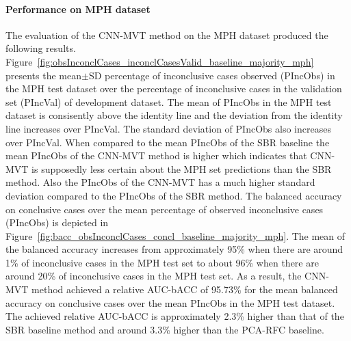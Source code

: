 
\paragraph{Performance on MPH dataset}

The evaluation of the CNN-MVT method on the MPH dataset produced the following results.
Figure~\ref{fig:obsInconclCases_inconclCasesValid_baseline_majority_mph} presents
the mean$\pm$SD percentage of inconclusive cases observed (PIncObs) in the MPH test dataset 
over the percentage of inconclusive cases in the validation set (PIncVal) of development dataset.
The mean of PIncObs in the MPH test dataset is consisently above the identity line 
and the deviation from the identity line increases over PIncVal.
The standard deviation of PIncObs also increases over PIncVal.
When compared to the mean PIncObs of the SBR baseline the mean PIncObs of the CNN-MVT method is higher 
which indicates that CNN-MVT is supposedly less certain about the MPH set predictions than the SBR method.
Also the PIncObs of the CNN-MVT has a much higher standard deviation compared to the PIncObs of the SBR method.
The balanced accuracy on conclusive cases over the mean percentage of observed inconclusive cases (PIncObs) is depicted 
in Figure~\ref{fig:bacc_obsInconclCases_concl_baseline_majority_mph}.
The mean of the balanced accuracy increases from approximately 95\% 
when there are around 1\% of inconclusive cases in the MPH test set to about 96\% 
when there are around 20\% of inconclusive cases in the MPH test set.
As a result, the CNN-MVT method achieved a relative AUC-bACC of 95.73\% for the mean balanced accuracy on conclusive cases 
over the mean PIncObs in the MPH test dataset.
The achieved relative AUC-bACC is approximately 2.3\% higher than that of the SBR baseline method 
and around 3.3\% higher than the PCA-RFC baseline.



